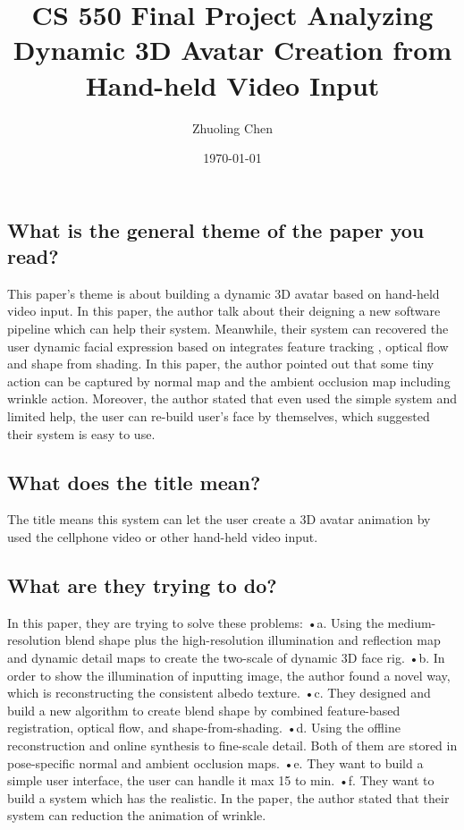 \documentclass[12pt,a4paper,titlepage]{article}
\title{\blue CS 550 Final Project Analyzing \\
\blueb Dynamic 3D Avatar Creation from Hand-held Video Input}
\author{Zhuoling Chen}
\date{\today}
\begin{document}
\maketitle

\section{}{%
\subsection{What is the general theme of the paper you read?}{

This paper's theme is about building a dynamic 3D avatar based on hand-held video input. In this paper, the author talk about their deigning a new software pipeline which can help their system. Meanwhile, their system can recovered the user dynamic facial expression based on integrates feature tracking , optical flow and shape from shading.\newline
In this paper, the author pointed out that some tiny action can be captured by normal map and the ambient occlusion map including wrinkle action. Moreover, the author stated that even used the simple system and limited help, the user can re-build user's face by themselves, which suggested their system is easy to use.}
\subsection{What does the title mean?}{
The title means this system can let the user create a 3D 
avatar animation by used the cellphone video or other hand-held video input.
}
\subsection{What are they trying to do? }{
In this paper, they are trying to solve these problems:\newline
•a. Using the medium-resolution blend shape plus the 
high-resolution illumination and reflection map and dynamic detail maps to create the two-scale of dynamic 3D face rig.\newline
•b. In order to show the illumination of inputting image, the author found a novel way, which is reconstructing the consistent albedo texture.\newline
•c. They designed and build a new algorithm to create blend shape by combined feature-based registration, optical flow, and shape-from-shading.\newline
•d. Using the offline reconstruction and online synthesis to fine-scale detail. Both of them are stored in pose-specific normal and ambient occlusion maps. \newline
•e. They want to build a simple user interface, the user can handle it max 15 to min.\newline
•f. They want to build a system which has the realistic. In the paper, the author stated that their system can reduction the animation of wrinkle.
}
}
\end{document}
